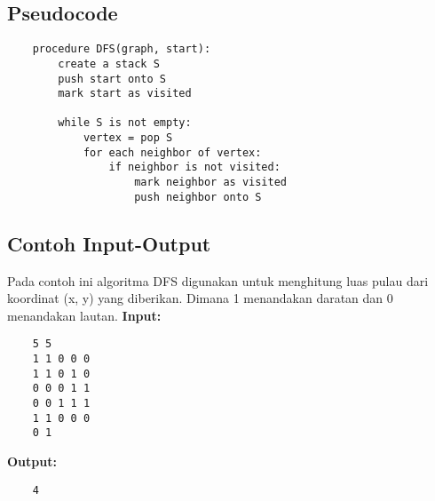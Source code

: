 \subsection{Pseudocode}
\begin{verbatim}
    procedure DFS(graph, start):
        create a stack S
        push start onto S
        mark start as visited

        while S is not empty:
            vertex = pop S
            for each neighbor of vertex:
                if neighbor is not visited:
                    mark neighbor as visited
                    push neighbor onto S
\end{verbatim}

\subsection{Contoh Input-Output}
Pada contoh ini algoritma DFS digunakan untuk menghitung luas pulau dari koordinat (x, y) yang diberikan. Dimana 1 menandakan daratan dan 0 menandakan lautan.
\textbf{Input:}
\begin{verbatim}
    5 5
    1 1 0 0 0
    1 1 0 1 0
    0 0 0 1 1
    0 0 1 1 1
    1 1 0 0 0
    0 1
\end{verbatim}

\textbf{Output:}
\begin{verbatim}
    4
\end{verbatim}





